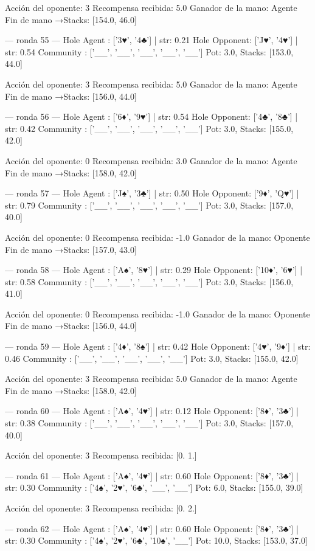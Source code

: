 Acción del oponente: 3
Recompensa recibida: 5.0
Ganador de la mano: Agente
Fin de mano →Stacks: [154.0, 46.0]


--- ronda 55 ---
Hole Agent : ['3♥', '4♣'] | str: 0.21
Hole Opponent: ['J♥', '4♥'] | str: 0.54
Community  : ['__', '__', '__', '__', '__']
Pot: 3.0, Stacks: [153.0, 44.0]

Acción del oponente: 3
Recompensa recibida: 5.0
Ganador de la mano: Agente
Fin de mano →Stacks: [156.0, 44.0]


--- ronda 56 ---
Hole Agent : ['6♦', '9♥'] | str: 0.54
Hole Opponent: ['4♣', '8♣'] | str: 0.42
Community  : ['__', '__', '__', '__', '__']
Pot: 3.0, Stacks: [155.0, 42.0]

Acción del oponente: 0
Recompensa recibida: 3.0
Ganador de la mano: Agente
Fin de mano →Stacks: [158.0, 42.0]


--- ronda 57 ---
Hole Agent : ['J♠', '3♣'] | str: 0.50
Hole Opponent: ['9♦', 'Q♥'] | str: 0.79
Community  : ['__', '__', '__', '__', '__']
Pot: 3.0, Stacks: [157.0, 40.0]

Acción del oponente: 0
Recompensa recibida: -1.0
Ganador de la mano: Oponente
Fin de mano →Stacks: [157.0, 43.0]


--- ronda 58 ---
Hole Agent : ['A♠', '8♥'] | str: 0.29
Hole Opponent: ['10♦', '6♥'] | str: 0.58
Community  : ['__', '__', '__', '__', '__']
Pot: 3.0, Stacks: [156.0, 41.0]

Acción del oponente: 0
Recompensa recibida: -1.0
Ganador de la mano: Oponente
Fin de mano →Stacks: [156.0, 44.0]


--- ronda 59 ---
Hole Agent : ['4♦', '8♠'] | str: 0.42
Hole Opponent: ['4♥', '9♦'] | str: 0.46
Community  : ['__', '__', '__', '__', '__']
Pot: 3.0, Stacks: [155.0, 42.0]

Acción del oponente: 3
Recompensa recibida: 5.0
Ganador de la mano: Agente
Fin de mano →Stacks: [158.0, 42.0]


--- ronda 60 ---
Hole Agent : ['A♠', '4♥'] | str: 0.12
Hole Opponent: ['8♦', '3♣'] | str: 0.38
Community  : ['__', '__', '__', '__', '__']
Pot: 3.0, Stacks: [157.0, 40.0]

Acción del oponente: 3
Recompensa recibida: [0. 1.]

--- ronda 61 ---
Hole Agent : ['A♠', '4♥'] | str: 0.60
Hole Opponent: ['8♦', '3♣'] | str: 0.30
Community  : ['4♠', '2♥', '6♣', '__', '__']
Pot: 6.0, Stacks: [155.0, 39.0]

Acción del oponente: 3
Recompensa recibida: [0. 2.]

--- ronda 62 ---
Hole Agent : ['A♠', '4♥'] | str: 0.60
Hole Opponent: ['8♦', '3♣'] | str: 0.30
Community  : ['4♠', '2♥', '6♣', '10♠', '__']
Pot: 10.0, Stacks: [153.0, 37.0]

